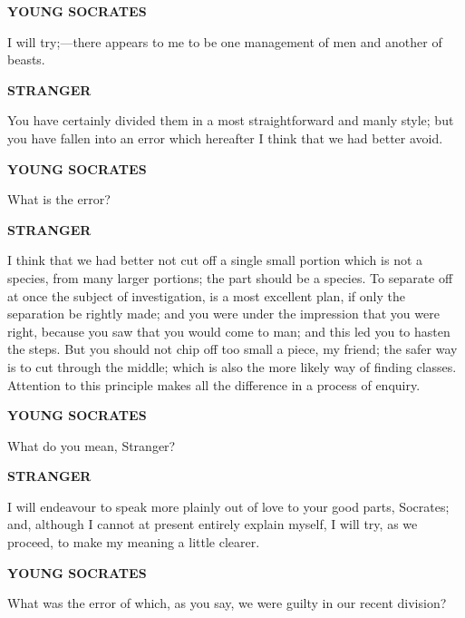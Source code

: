 \documentclass[11pt,letter]{article}
\begin{document}
\par \textbf{YOUNG SOCRATES}
\par   I will try;—there appears to me to be one management of men and another of beasts.

\par \textbf{STRANGER}
\par   You have certainly divided them in a most straightforward and manly style; but you have fallen into an error which hereafter I think that we had better avoid.

\par \textbf{YOUNG SOCRATES}
\par   What is the error?

\par \textbf{STRANGER}
\par   I think that we had better not cut off a single small portion which is not a species, from many larger portions; the part should be a species. To separate off at once the subject of investigation, is a most excellent plan, if only the separation be rightly made; and you were under the impression that you were right, because you saw that you would come to man; and this led you to hasten the steps. But you should not chip off too small a piece, my friend; the safer way is to cut through the middle; which is also the more likely way of finding classes. Attention to this principle makes all the difference in a process of enquiry.

\par \textbf{YOUNG SOCRATES}
\par   What do you mean, Stranger?

\par \textbf{STRANGER}
\par   I will endeavour to speak more plainly out of love to your good parts, Socrates; and, although I cannot at present entirely explain myself, I will try, as we proceed, to make my meaning a little clearer.

\par \textbf{YOUNG SOCRATES}
\par   What was the error of which, as you say, we were guilty in our recent division?
\end{document}
